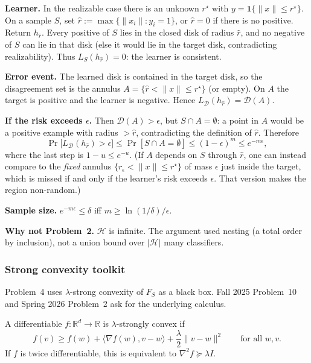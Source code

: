 \begin{solution}
\textbf{Learner.}
In the realizable case there is an unknown $r^\star$ with $y=\mathbf{1}\{\lVert x\rVert\le r^\star\}$. On a sample $S$, set $\widehat{r}:=\max\{\lVert x_i\rVert:y_i=1\}$, or $\widehat{r}=0$ if there is no positive. Return $h_{\widehat{r}}$. Every positive of $S$ lies in the closed disk of radius $\widehat{r}$, and no negative of $S$ can lie in that disk (else it would lie in the target disk, contradicting realizability). Thus $L_S(h_{\widehat{r}})=0$: the learner is consistent.

\textbf{Error event.}
The learned disk is contained in the target disk, so the disagreement set is the annulus $A=\{\widehat{r}<\lVert x\rVert\le r^\star\}$ (or empty). On $A$ the target is positive and the learner is negative. Hence $L_{\mathcal{D}}(h_{\widehat{r}})=\mathcal{D}(A)$.

\textbf{If the risk exceeds $\epsilon$.}
Then $\mathcal{D}(A)>\epsilon$, but $S\cap A=\emptyset$: a point in $A$ would be a positive example with radius $>\widehat{r}$, contradicting the definition of $\widehat{r}$. Therefore
\[
\Pr\bigl[L_{\mathcal{D}}(h_{\widehat{r}})>\epsilon\bigr]
\le
\Pr[S\cap A=\emptyset]
\le
(1-\epsilon)^m
\le
e^{-m\epsilon},
\]
where the last step is $1-u\le e^{-u}$. (If $A$ depends on $S$ through $\widehat{r}$, one can instead compare to the \emph{fixed} annulus $\{r_\epsilon<\lVert x\rVert\le r^\star\}$ of mass $\epsilon$ just inside the target, which is missed if and only if the learner's risk exceeds $\epsilon$. That version makes the region non-random.)

\textbf{Sample size.}
$e^{-m\epsilon}\le\delta$ iff $m\ge\ln(1/\delta)/\epsilon$.

\textbf{Why not Problem~2.}
$\mathcal{H}$ is infinite. The argument used nesting (a total order by inclusion), not a union bound over $\lvert\mathcal{H}\rvert$ many classifiers.
\end{solution}


\subsubsection{Strong convexity toolkit}
\label{subsubsec:mlu-sc}

Problem~4 uses $\lambda$-strong convexity of $F_S$ as a black box. Fall 2025 Problem~10 and Spring 2026 Problem~2 ask for the underlying calculus.

\begin{definition}
\label{def:mlu-sc}
A differentiable $f:\mathbb{R}^d\to\mathbb{R}$ is $\lambda$-strongly convex if
\[
f(v)
\ge
f(w)+\langle\nabla f(w),v-w\rangle+\frac{\lambda}{2}\lVert v-w\rVert^2
\qquad\text{for all }w,v.
\]
If $f$ is twice differentiable, this is equivalent to $\nabla^2 f\succeq\lambda I$.
\end{definition}

